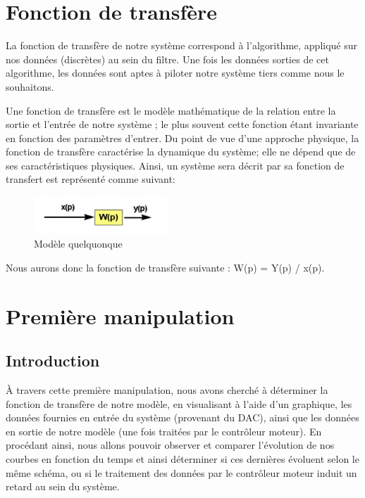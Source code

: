 \documentclass[french,a4paper,12pt]{report}
\begin{document}
		
	\chapter{Fonction de transfère}
	
		La fonction de transfère de notre système correspond à l'algorithme, appliqué sur nos données (discrètes) au sein du filtre. Une fois les données sorties de cet algorithme, les données sont aptes à piloter notre système tiers comme nous le souhaitons.
		
		Une fonction de transfère est le modèle mathématique de la relation entre la sortie et l'entrée de notre système ; le plus souvent cette fonction étant invariante en fonction des paramètres d'entrer.
		Du point de vue d'une approche physique, la fonction de transfère caractérise la dynamique du système; elle ne dépend que de ses caractéristiques physiques. 
		Ainsi, un système sera décrit par sa fonction de transfert est représenté comme suivant:

	\begin{figure}[!ht]
    \center
  	\includegraphics[width=5cm]{transf1.png}
    \caption{Modèle quelquonque}
	\end{figure}
	
	Nous aurons donc la fonction de transfère suivante : W(p) = Y(p) / x(p).
	
	\newpage
	
	\chapter{Première manipulation}
	
		\section{Introduction}
	
		À travers cette première manipulation, nous avons cherché à déterminer la fonction de transfère de notre modèle, en visualisant à l'aide d'un graphique, les données fournies en entrée du système (provenant du DAC), ainsi que les données en sortie de notre modèle (une fois traitées par le contrôleur moteur).
		En procédant ainsi, nous allons pouvoir observer et comparer l'évolution de nos courbes en fonction du temps et ainsi déterminer si ces dernières évoluent selon le même schéma, ou si le traitement des données par le contrôleur moteur induit un retard au sein du système.
		
\end{document}

